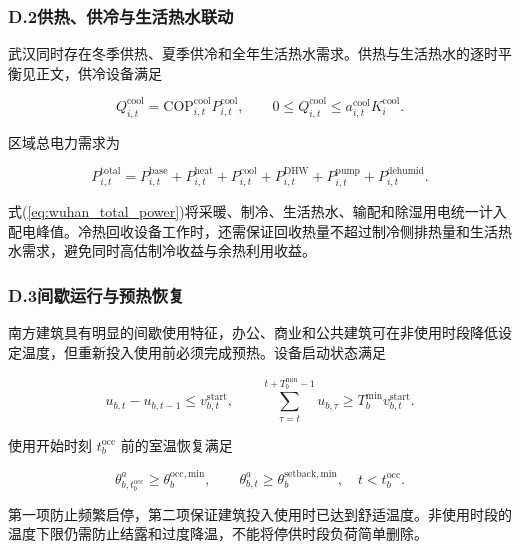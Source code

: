 \subsubsection*{D.2\quad 供热、供冷与生活热水联动}

武汉同时存在冬季供热、夏季供冷和全年生活热水需求。供热与生活热水的逐时平衡见正文，供冷设备满足

\begin{equation}
Q_{i,t}^{\mathrm{cool}}=\mathrm{COP}_{i,t}^{\mathrm{cool}}P_{i,t}^{\mathrm{cool}},
\qquad
0\leq Q_{i,t}^{\mathrm{cool}}\leq a_{i,t}^{\mathrm{cool}}K_i^{\mathrm{cool}}.
\label{eq:wuhan_cooling}
\end{equation}

区域总电力需求为

\begin{equation}
P_{i,t}^{\mathrm{total}}
=P_{i,t}^{\mathrm{base}}+P_{i,t}^{\mathrm{heat}}+P_{i,t}^{\mathrm{cool}}
+P_{i,t}^{\mathrm{DHW}}+P_{i,t}^{\mathrm{pump}}+P_{i,t}^{\mathrm{dehumid}}.
\label{eq:wuhan_total_power}
\end{equation}

式(\ref{eq:wuhan_total_power})将采暖、制冷、生活热水、输配和除湿用电统一计入配电峰值。冷热回收设备工作时，还需保证回收热量不超过制冷侧排热量和生活热水需求，避免同时高估制冷收益与余热利用收益。

\subsubsection*{D.3\quad 间歇运行与预热恢复}

南方建筑具有明显的间歇使用特征，办公、商业和公共建筑可在非使用时段降低设定温度，但重新投入使用前必须完成预热。设备启动状态满足

\begin{equation}
u_{b,t}-u_{b,t-1}\leq v_{b,t}^{\mathrm{start}},
\qquad
\sum_{\tau=t}^{t+T_b^{\min}-1}u_{b,\tau}
\geq T_b^{\min}v_{b,t}^{\mathrm{start}}.
\label{eq:wuhan_startup}
\end{equation}

使用开始时刻 $t_b^{\mathrm{occ}}$ 前的室温恢复满足

\begin{equation}
\theta_{b,t_b^{\mathrm{occ}}}^{a}\geq\theta_b^{\mathrm{occ,min}},
\qquad
\theta_{b,t}^{a}\geq\theta_b^{\mathrm{setback,min}},
\quad t<t_b^{\mathrm{occ}}.
\label{eq:wuhan_preheat}
\end{equation}

第一项防止频繁启停，第二项保证建筑投入使用时已达到舒适温度。非使用时段的温度下限仍需防止结露和过度降温，不能将停供时段负荷简单删除。

